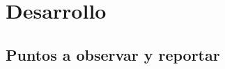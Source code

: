 \documentclass[12pt]{article}
\begin{document}
    
    \section{Desarrollo}
    \subsection{Puntos a observar y reportar}
            
        
\end{document}
